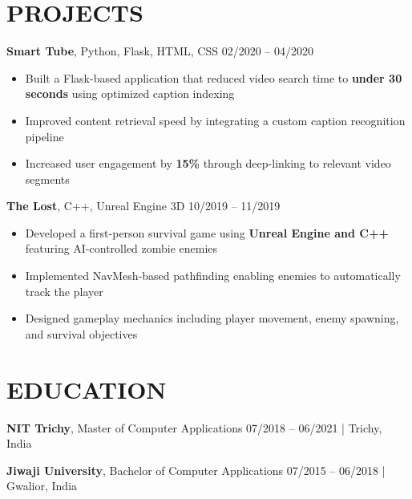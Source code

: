 \documentclass[11.9pt,a4paper]{article}
\begin{document}
\vspace{6pt}

\section*{PROJECTS}

\noindent
\textbf{Smart Tube}, Python, Flask, HTML, CSS \hfill 02/2020 -- 04/2020
\begin{itemize}
  \item Built a Flask-based application that reduced video search time to \textbf{under 30 seconds} using optimized caption indexing
  \item Improved content retrieval speed by integrating a custom caption recognition pipeline
  \item Increased user engagement by \textbf{15\%} through deep-linking to relevant video segments
\end{itemize}

\vspace{5pt}

\noindent
\textbf{The Lost}, C++, Unreal Engine 3D \hfill 10/2019 -- 11/2019
\begin{itemize}
  \item Developed a first-person survival game using \textbf{Unreal Engine and C++} featuring AI-controlled zombie enemies
  \item Implemented NavMesh-based pathfinding enabling enemies to automatically track the player
  \item Designed gameplay mechanics including player movement, enemy spawning, and survival objectives
\end{itemize}

\section*{EDUCATION}

\noindent
\textbf{NIT Trichy}, Master of Computer Applications \hfill 07/2018 -- 06/2021 | Trichy, India

\vspace{5pt}

\noindent
\textbf{Jiwaji University}, Bachelor of Computer Applications \hfill 07/2015 -- 06/2018 | Gwalior, India

\vspace{6pt}
\end{document}
